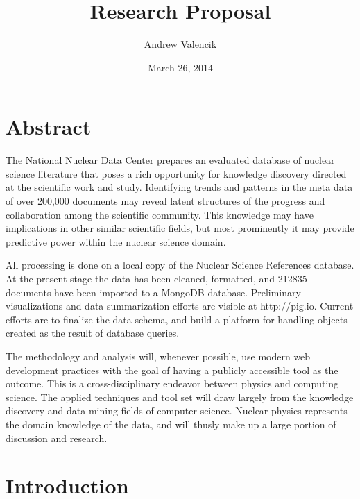 \documentclass[12pt]{article}
\begin{document}
\title{Research Proposal}
\author{Andrew Valencik}
\date{March 26, 2014}
\maketitle
\tableofcontents
\listoffigures
\begin{doublespacing}


\pagebreak
\section{Abstract}
The National Nuclear Data Center prepares an evaluated database of nuclear science literature that poses a rich opportunity for knowledge discovery directed at the scientific work and study. 
Identifying trends and patterns in the meta data of over 200,000 documents may reveal latent structures of the progress and collaboration among the scientific community. 
This knowledge may have implications in other similar scientific fields, but most prominently it may provide predictive power within the nuclear science domain.

All processing is done on a local copy of the Nuclear Science References database.
At the present stage the data has been cleaned, formatted, and 212835 documents have been imported to a MongoDB database. 
Preliminary visualizations and data summarization efforts are visible at http://pig.io.
Current efforts are to finalize the data schema, and build a platform for handling objects created as the result of database queries.

The methodology and analysis will, whenever possible, use modern web development practices with the goal of having a publicly accessible tool as the outcome. 
This is a cross-disciplinary endeavor between physics and computing science. 
The applied techniques and tool set will draw largely from the knowledge discovery and data mining fields of computer science. 
Nuclear physics represents the domain knowledge of the data, and will thusly make up a large portion of discussion and research.

\pagebreak
\section{Introduction}


\end{doublespacing}
\end{document}
